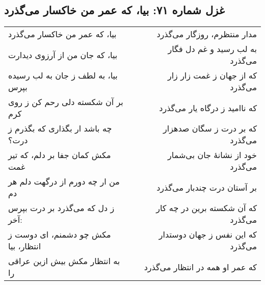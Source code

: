 \begin{center}
\section*{غزل شماره ۷۱: بیا، که عمر من خاکسار می‌گذرد}
\label{sec:071}
\begin{longtable}{l p{0.5cm} r}
بیا، که عمر من خاکسار می‌گذرد
&&
مدار منتظرم، روزگار می‌گذرد
\\
بیا، که جان من از آرزوی دیدارت
&&
به لب رسید و غم دل فگار می‌گذرد
\\
بیا، به لطف ز جان به لب رسیده بپرس
&&
که از جهان ز غمت زار زار می‌گذرد
\\
بر آن شکسته دلی رحم کن ز روی کرم
&&
که ناامید ز درگاه یار می‌گذرد
\\
چه باشد ار بگذاری که بگذرم ز درت؟
&&
که بر درت ز سگان صدهزار می‌گذرد
\\
مکش کمان جفا بر دلم، که تیر غمت
&&
خود از نشانهٔ جان بی‌شمار می‌گذرد
\\
من ار چه دورم از درگهت دلم هر دم
&&
بر آستان درت چندبار می‌گذرد
\\
ز دل که می‌گذرد بر درت بپرس آخر:
&&
که آن شکسته برین در چه کار می‌گذرد
\\
مکش چو دشمنم، ای دوست ز انتظار، بیا
&&
که این نفس ز جهان دوستدار می‌گذرد
\\
به انتظار مکش بیش ازین عراقی را
&&
که عمر او همه در انتظار می‌گذرد
\\
\end{longtable}
\end{center}
